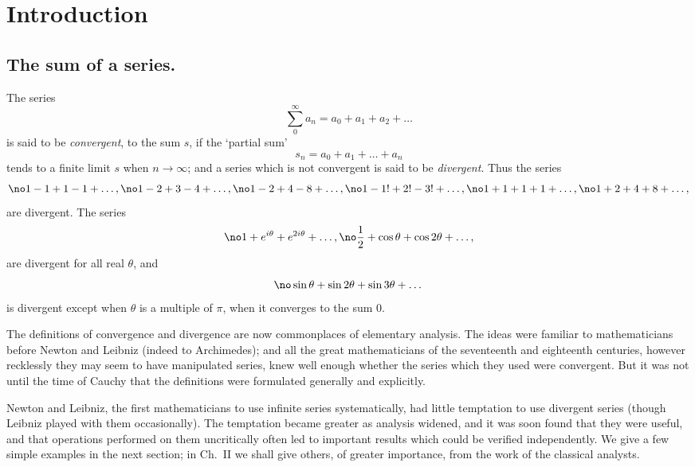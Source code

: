 
\chapter{Introduction}

\section{The sum of a series.} The series
$$\sum_0^\infty a_n = a_0+a_1+a_2+\dots$$
is said to be \emph{convergent}, to the sum $s$, if the `partial sum'
$$s_n = a_0+a_1+\dots+a_n$$
tends to a finite limit $s$ when $n\to\infty$; and a series which is not
convergent is said to be \emph{divergent}. Thus the series
$$\no\label{1-1} 1-1+1-1+\dots, \no 1-2+3-4+\dots, \\
  \no 1-2+4-8+\dots, \no 1-1!+2!-3!+\dots, \\
  \no 1+1+1+1+\dots, \no 1+2+4+8+\dots,$$
are divergent. The series
$$\no 1+e^{i\theta}+e^{2i\theta}+\dots, \no \frac12+\cos\theta+\cos2\theta+\dots,$$
are divergent for all real $\theta$, and
$$\no \sin\theta+\sin2\theta+\sin3\theta+\dots$$
is divergent except when $\theta$ is a multiple of $\pi$, when it converges to
the sum 0.

The definitions of convergence and divergence are now commonplaces of
elementary analysis. The ideas were familiar to mathematicians before Newton
and Leibniz (indeed to Archimedes); and all the great mathematicians of the
seventeenth and eighteenth centuries, however recklessly they may seem to
have manipulated series, knew well enough whether the series which they used
were convergent. But it was not until the time of Cauchy that the
definitions were formulated generally and explicitly.

Newton and Leibniz, the first mathematicians to use infinite series
systematically, had little temptation to use divergent series (though
Leibniz played with them occasionally). The temptation became greater as
analysis widened, and it was soon found that they were useful, and that
operations performed on them uncritically often led to important results
which could be verified independently. We give a few simple examples in the
next section; in Ch.~II we shall give others, of greater importance, from
the work of the classical analysts.

